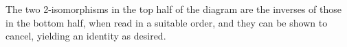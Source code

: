 \documentclass[reqno]{amsart}
\begin{document}
The two 2-isomorphisms in the top half of the diagram are the inverses of those in the bottom half, when read in a suitable order, and they can be shown to cancel, yielding an identity as desired.
\end{document}

